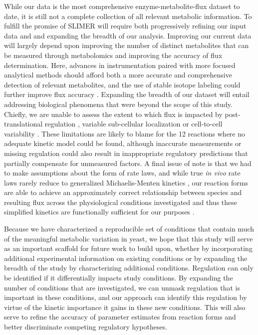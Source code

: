 While our data is the most comprehensive enzyme-metabolite-flux dataset to date, it is still not a complete collection of all relevant metabolic information.  To fulfill the promise of SLIMER will require both progressively refining our input data and and expanding the breadth of our analysis.  Improving our current data will largely depend upon improving the number of distinct metabolites that can be measured through metabolomics and improving the accuracy of flux determination.  Here, advances in instrumentation paired with more focused analytical methods should afford both a more accurate and comprehensive detection of relevant metabolites, and the use of stable isotope labeling could further improve flux accuracy \cite{Yuan:2008er}.  Expanding the breadth of our dataset will entail addressing biological phenomena that were beyond the scope of this study.  Chiefly, we are unable to assess the extent to which flux is impacted by post-translational regulation \cite{Fiedler:2009hx, Schulz:2014eo}, variable sub-cellular localization \cite{Kitamoto:1988wc} or cell-to-cell variability \cite{Tu:2005cv}.  These limitations are likely to blame for the 12 reactions where no adequate kinetic model could be found, although inaccurate measurements or missing regulation could also result in inappropriate regulatory predictions that partially compensate for unmeasured factors.  A final issue of note is that we had to make assumptions about the form of rate laws, and while true \textit{in vivo} rate laws rarely reduce to generalized Michaelis-Menten kinetics \cite{Hill:1977vm}, our reaction forms are able to achieve an approximately correct relationship between species and resulting flux across the physiological conditions investigated and thus these simplified kinetics are functionally sufficient for our purposes \cite{Fell:1997wg}.

Because we have characterized a reproducible set of conditions that contain much of the meaningful metabolic variation in yeast, we hope that this study will serve as an important scaffold for future work to build upon, whether by incorporating additional experimental information on existing conditions or by expanding the breadth of the study by characterizing additional conditions. Regulation can only be identified if it differentially impacts study conditions. By expanding the number of conditions that are investigated, we can unmask regulation that is important in these conditions, and our approach can identify this regulation by virtue of the kinetic importance it gains in these new conditions. This will also serve to refine the accuracy of parameter estimates from reaction forms and better discriminate  competing regulatory hypotheses.



